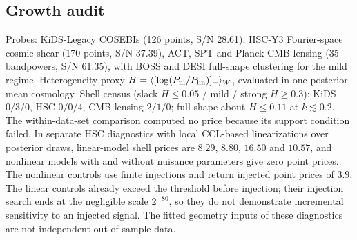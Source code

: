 \hypertarget{b.6-growth-audit}{%
\subsection{Growth audit}\label{b.6-growth-audit}}

Probes: KiDS-Legacy COSEBIs (126 points, S/N 28.61), HSC-Y3
Fourier-space cosmic shear (170 points, S/N 37.39), ACT, SPT and Planck
CMB lensing (35 bandpowers, S/N 61.35), with BOSS and DESI full-shape
clustering for the mild regime. Heterogeneity proxy
\(H=\langle[\log(P_{\rm nl}/P_{\rm lin})]_+\rangle_W\), evaluated in one
posterior-mean cosmology. Shell census (slack \(H\le0.05\) / mild /
strong \(H\ge0.3\)): KiDS \(0/3/0\), HSC \(0/0/4\), CMB lensing
\(2/1/0\); full-shape about \(H\le0.11\) at \(k\lesssim0.2\). The
within-data-set comparison computed no price because its support
condition failed. In separate HSC diagnostics with local CCL-based
linearizations over posterior draws, linear-model shell prices are
\(8.29\), \(8.80\), \(16.50\) and \(10.57\), and nonlinear models with
and without nuisance parameters give zero point prices. The nonlinear
controls use finite injections and return injected point prices of
\(3.9\). The linear controls already exceed the threshold before
injection; their injection search ends at the negligible scale
\(2^{-80}\), so they do not demonstrate incremental sensitivity to an
injected signal. The fitted geometry inputs of these diagnostics are not
independent out-of-sample data.
